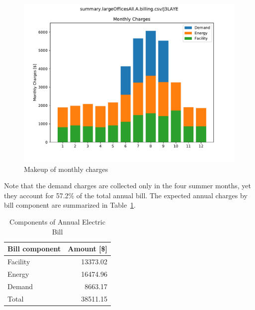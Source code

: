\documentclass[11pt]{article}
\begin{document}
\begin{figure}[!h]
\centering
\includegraphics[width=\columnwidth, page=1, trim=0in 0.45in 0in 0.45in, clip]{visuals/J3LAYE.boxplot.pdf}
\caption{Makeup of monthly charges}
\label{fig:bars}
\end{figure}

Note that the demand charges are collected only in the four summer months, yet they account for 57.2\% of the total annual bill. The expected annual charges by bill component are summarized in Table~\ref{tab:annual}.

\begin{table}[th!]
  \centering
  \caption{Components of Annual Electric Bill}
  \vspace{1.5ex}
  \label{tab:annual}
  \begin{tabular}{lr}
    Bill component & Amount [\$] \\
    \midrule
    Facility & 13373.02 \\
    Energy & 16474.96 \\
    Demand & 8663.17 \\
    \midrule
    Total & 38511.15
  \end{tabular}
\end{table}
\clearpage

\pagestyle{energy}
\end{document}
